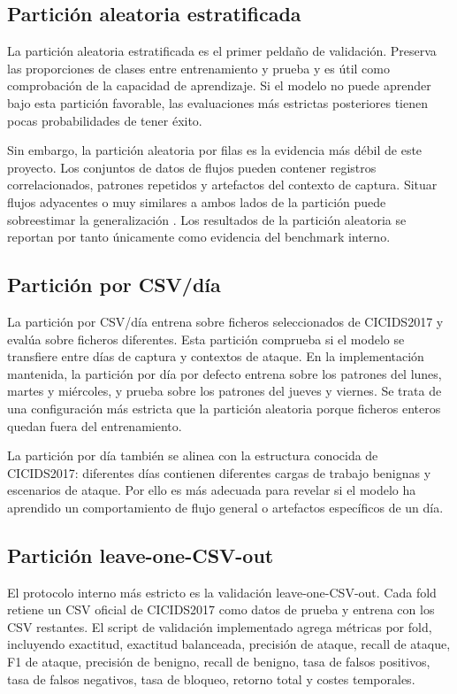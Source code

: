 \subsection{Partición aleatoria estratificada}
La partición aleatoria estratificada es el primer peldaño de validación. Preserva las proporciones de clases entre entrenamiento y prueba y es útil como comprobación de la capacidad de aprendizaje. Si el modelo no puede aprender bajo esta partición favorable, las evaluaciones más estrictas posteriores tienen pocas probabilidades de tener éxito.

Sin embargo, la partición aleatoria por filas es la evidencia más débil de este proyecto. Los conjuntos de datos de flujos pueden contener registros correlacionados, patrones repetidos y artefactos del contexto de captura. Situar flujos adyacentes o muy similares a ambos lados de la partición puede sobreestimar la generalización \parencite{Lanvin2023Errors,Arp2020DosDontsMLSecurity}. Los resultados de la partición aleatoria se reportan por tanto únicamente como evidencia del benchmark interno.

\subsection{Partición por CSV/día}
La partición por CSV/día entrena sobre ficheros seleccionados de CICIDS2017 y evalúa sobre ficheros diferentes. Esta partición comprueba si el modelo se transfiere entre días de captura y contextos de ataque. En la implementación mantenida, la partición por día por defecto entrena sobre los patrones del lunes, martes y miércoles, y prueba sobre los patrones del jueves y viernes. Se trata de una configuración más estricta que la partición aleatoria porque ficheros enteros quedan fuera del entrenamiento.

La partición por día también se alinea con la estructura conocida de CICIDS2017: diferentes días contienen diferentes cargas de trabajo benignas y escenarios de ataque. Por ello es más adecuada para revelar si el modelo ha aprendido un comportamiento de flujo general o artefactos específicos de un día.

\subsection{Partición leave-one-CSV-out}
El protocolo interno más estricto es la validación leave-one-CSV-out. Cada fold retiene un CSV oficial de CICIDS2017 como datos de prueba y entrena con los CSV restantes. El script de validación implementado agrega métricas por fold, incluyendo exactitud, exactitud balanceada, precisión de ataque, recall de ataque, F1 de ataque, precisión de benigno, recall de benigno, tasa de falsos positivos, tasa de falsos negativos, tasa de bloqueo, retorno total y costes temporales.

